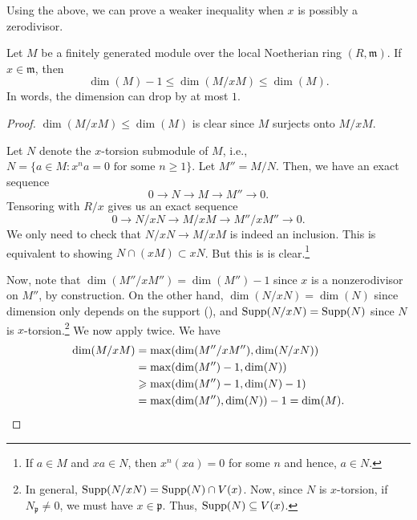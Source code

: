 \documentclass[12pt]{article}
\begin{document}
Using the above, we can prove a weaker inequality when $x$ is possibly a zerodivisor.

\begin{cor} \label{cor:quotient-drop-at-most-one}
	Let $M$ be a finitely generated module over the local Noetherian ring $(R, \mathfrak{m})$. \newline
	If $x \in \mathfrak{m}$, then
	\begin{equation*} 
		\dim(M) - 1 \le \dim(M/xM) \le \dim(M).
	\end{equation*}
	In words, the dimension can drop by at most $1$.
\end{cor}
\begin{proof} 
	$\dim(M/xM) \le \dim(M)$ is clear since $M$ surjects onto $M/xM$.

	Let $N$ denote the $x$-torsion submodule of $M$, i.e., $N = \{a \in M : x^{n} a = 0 \text{ for some } n \ge 1\}$. Let $M'' = M/N$. Then, we have an exact sequence
	\begin{equation*} 
		0 \to N \to M \to M'' \to 0.
	\end{equation*}
	Tensoring with $R/x$ gives us an exact sequence
	\begin{equation*} 
		0 \to N/xN \to M/xM \to M''/xM'' \to 0.
	\end{equation*}
	We only need to check that $N/xN \to M/xM$ is indeed an inclusion. This is equivalent to showing $N \cap (xM) \subset xN$. But this is is clear.\footnote{If $a \in M$ and $xa \in N$, then $x^{n}(xa) = 0$ for some $n$ and hence, $a \in N$.} 

	Now, note that $\dim(M''/xM'') = \dim(M'') - 1$ since $x$ is a nonzerodivisor on $M''$, by construction. \newline
	On the other hand, $\dim(N/xN) = \dim(N)$ since dimension only depends on the support (), and $\Supp(N/xN) = \Supp(N)$ since $N$ is $x$-torsion.\footnote{In general, $\Supp(N/xN) = \Supp(N) \cap V(x)$. Now, since $N$ is $x$-torsion, if $N_{\mathfrak{p}} \neq 0$, we must have $x \in \mathfrak{p}$. Thus, $\Supp(N) \subset V(x)$.} We now apply  twice. We have
	\begin{align*} 
		\dim(M/xM) &= \max(\dim(M''/xM''), \dim(N/xN)) \\
		&= \max(\dim(M'') - 1, \dim(N)) \\
		&\ge \max(\dim(M'') - 1, \dim(N) - 1) \\
		&= \max(\dim(M''), \dim(N)) - 1 = \dim(M). \qedhere
	\end{align*}
\end{proof}
\end{document}
